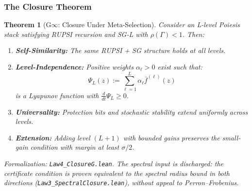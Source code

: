 \documentclass[12pt]{article}
\newtheorem{theorem}{Theorem}[section]
\begin{document}
\subsubsection{The Closure Theorem}

\begin{theorem}[G$\infty$: Closure Under Meta-Selection]
\label{thm:g-infinity}
Consider an L-level Poiesis stack satisfying RUPSI recursion and SG-L with $\rho(\Gamma) < 1$. Then:
\begin{enumerate}
    \item[(a)] \textbf{Self-Similarity:} The same RUPSI + SG structure holds at all levels.
    
    \item[(b)] \textbf{Level-Independence:} Positive weights $\alpha_\ell > 0$ exist such that:
    \[
    \Psi_L(z) := \sum_{\ell=1}^L \alpha_\ell \bar{f}^{(\ell)}(z)
    \]
    is a Lyapunov function with $\frac{d}{dt} \Psi_L \geq 0$.
    
    \item[(c)] \textbf{Universality:} Protection bits and stochastic stability extend uniformly across levels.
    
    \item[(d)] \textbf{Extension:} Adding level $(L+1)$ with bounded gains preserves the small-gain condition with margin at least $\sigma/2$.
\end{enumerate}
\end{theorem}
\noindent\textit{Formalization: \texttt{Law4\_ClosureG.lean}. The spectral input is discharged: the certificate condition is proven equivalent to the spectral radius bound in both directions (\texttt{Law3\_SpectralClosure.lean}), without appeal to Perron--Frobenius.}
\end{document}
